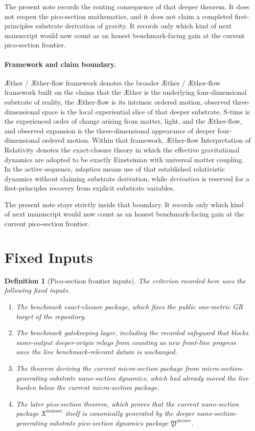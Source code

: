 \documentclass[11pt]{article}
\newcommand{\Aether}{\AE{}ther}
\newcommand{\Aflow}{\AE{}ther-flow}
\newcommand{\TheoryName}{\Aflow{} Interpretation of Relativity}
\newcommand{\TheoryProgram}{\Aether{} / \Aflow{} framework}
\newcommand{\NanoSectionPackage}{\mathfrak X^{\mathrm{nanosec}}}
\newcommand{\PicoSectionPackage}{\mathfrak Y^{\mathrm{picosec}}}
\newtheorem{definition}{Definition}
\begin{document}
The present note records the routing consequence of that deeper theorem. It does not reopen the pico-section mathematics, and it does not claim a completed first-principles substrate derivation of gravity. It records only which kind of next manuscript would now count as an honest benchmark-facing gain at the current pico-section frontier.

\paragraph{Framework and claim boundary.}
\TheoryProgram{} denotes the broader \Aether{} / \Aflow{} framework built on the claims that the \Aether{} is the underlying four-dimensional substrate of reality, the \Aflow{} is its intrinsic ordered motion, observed three-dimensional space is the local experiential slice of that deeper substrate, S-time is the experienced order of change arising from matter, light, and the \Aflow{}, and observed expansion is the three-dimensional appearance of deeper four-dimensional ordered motion. Within that framework, \TheoryName{} denotes the exact-closure theory in which the effective gravitational dynamics are adopted to be exactly Einsteinian with universal matter coupling. In the active sequence, \emph{adoption} means use of that established relativistic dynamics without claiming substrate derivation, while \emph{derivation} is reserved for a first-principles recovery from explicit substrate variables.

The present note stays strictly inside that boundary. It records only which kind of next manuscript would now count as an honest benchmark-facing gain at the current pico-section frontier.

\section{Fixed Inputs}

\begin{definition}[Pico-section frontier inputs]
The criterion recorded here uses the following fixed inputs.
\begin{enumerate}
    \item The benchmark exact-closure package, which fixes the public one-metric GR target of the repository.
    \item The benchmark gatekeeping layer, including the recorded safeguard that blocks same-output deeper-origin relays from counting as new front-line progress once the live benchmark-relevant datum is unchanged.
    \item The theorem deriving the current micro-section package from micro-section-generating substrate nano-section dynamics, which had already moved the live burden below the current micro-section package.
    \item The later pico-section theorem, which proves that the current nano-section package \(\NanoSectionPackage\) itself is canonically generated by the deeper nano-section-generating substrate pico-section dynamics package \(\PicoSectionPackage\).
\end{enumerate}
\end{definition}
\end{document}
